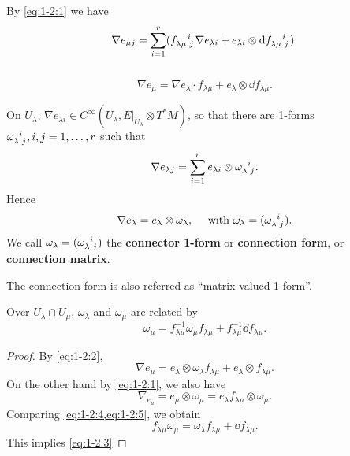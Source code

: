 \documentclass[12pt]{article}
\begin{document}
By \cref{eq:1-2:1} we have \[
    \nabla e_{\mu j}=\sum_{i=1}^{r}(\tensor{f}{_\lambda_\mu^i_j}\nabla 
    e_{\lambda i}+e_{\lambda i}\otimes \dd{\tensor{f}{_\lambda_\mu^i_j}})
.\] \ie\ 
\begin{equation}\label{eq:1-2:2}
    \nabla e_\mu=\nabla e_\lambda\cdot f_{\lambda\mu}+e_\lambda\otimes 
    \dd{f_{\lambda\mu}}
.\end{equation}

\begin{definition}
    On \(U_\lambda\), \(\nabla e_{\lambda i} \in C^\infty(U_\lambda,
    E\Big|_{U_\lambda}\otimes T^*M)\), so that there are 1-forms
    \(\tensor{\omega}{_\lambda^i_j}, i,j=1,\ldots,r\) such that \[
        \nabla e_{\lambda j}=\sum_{i=1}^{r}e_{\lambda i}\otimes 
        \tensor{\omega}{_\lambda^i_j}
    .\] Hence \[
        \nabla e_\lambda=e_\lambda\otimes \omega_\lambda, \quad
        \text{ with }\omega_\lambda=(\tensor{\omega}{_\lambda^i_j})
    .\] We call \(\omega_\lambda=(\tensor{\omega}{_\lambda^i_j})\) the
    \textbf{connector 1-form} or \textbf{connection form}, or
    \textbf{connection matrix}.
\end{definition}
The connection form is also referred as ``matrix-valued 1-form''.

\begin{prop}
    Over \(U_\lambda\cap U_\mu\), \(\omega_\lambda\) and \(\omega_\mu\)
    are related by
    \begin{equation}\label{eq:1-2:3}
        \omega_\mu=f_{\lambda\mu}^{-1}\omega_\mu f_{\lambda\mu}
        +f_{\lambda\mu}^{-1}\dd{f_{\lambda\mu}}
    .\end{equation}
\end{prop}
\begin{proof}
    By \cref{eq:1-2:2},
    \begin{equation}\label{eq:1-2:4}
        \nabla e_\mu=e_\lambda\otimes \omega_\lambda f_{\lambda\mu}
        +e_{\lambda}\otimes f_{\lambda\mu}
    .\end{equation}
    On the other hand by \cref{eq:1-2:1}, we also have
    \begin{equation}\label{eq:1-2:5}
        \nabla_{e_\mu}=e_{\mu}\otimes \omega_\mu
        =e_\lambda f_{\lambda\mu}\otimes \omega_\mu
    .\end{equation}
    Comparing \cref{eq:1-2:4,eq:1-2:5}, we obtain \[
        f_{\lambda\mu}\omega_\mu=\omega_\lambda f_{\lambda\mu}
        +\dd{f_{\lambda\mu}}
    .\] This implies \cref{eq:1-2:3}
\end{proof}
\end{document}
